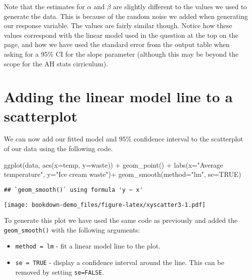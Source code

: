 \documentclass[
]{book}
\newenvironment{Shaded}{\begin{snugshade}}{\end{snugshade}}
\newcommand{\AttributeTok}[1]{\textcolor[rgb]{0.77,0.63,0.00}{#1}}
\newcommand{\ConstantTok}[1]{\textcolor[rgb]{0.00,0.00,0.00}{#1}}
\newcommand{\FunctionTok}[1]{\textcolor[rgb]{0.00,0.00,0.00}{#1}}
\newcommand{\NormalTok}[1]{#1}
\newcommand{\SpecialCharTok}[1]{\textcolor[rgb]{0.00,0.00,0.00}{#1}}
\newcommand{\StringTok}[1]{\textcolor[rgb]{0.31,0.60,0.02}{#1}}
\providecommand{\tightlist}{%
  \setlength{\itemsep}{0pt}\setlength{\parskip}{0pt}}
\begin{document}
Note that the estimates for \(\alpha\) and \(\beta\) are slightly different to the values we used to generate the data. This is because of the random noise we added when generating our response variable. The values are fairly similar though. Notice how these values correspond with the linear model used in the question at the top on the page, and how we have used the standard error from the output table when asking for a 95\% CI for the slope parameter (although this may be beyond the scope for the AH stats cirriculum).

\hypertarget{adding-the-linear-model-line-to-a-scatterplot}{%
\section{Adding the linear model line to a scatterplot}\label{adding-the-linear-model-line-to-a-scatterplot}}

We can now add our fitted model and 95\% confidence interval to the scatterplot of our data using the following code.

\begin{Shaded}
\begin{Highlighting}[]
\FunctionTok{ggplot}\NormalTok{(data, }\FunctionTok{aes}\NormalTok{(}\AttributeTok{x=}\NormalTok{temp, }\AttributeTok{y=}\NormalTok{waste)) }\SpecialCharTok{+} 
  \FunctionTok{geom\_point}\NormalTok{() }\SpecialCharTok{+} 
  \FunctionTok{labs}\NormalTok{(}\AttributeTok{x=}\StringTok{"Average temperature"}\NormalTok{, }\AttributeTok{y=}\StringTok{"Ice cream waste"}\NormalTok{)}\SpecialCharTok{+}
  \FunctionTok{geom\_smooth}\NormalTok{(}\AttributeTok{method=}\StringTok{"lm"}\NormalTok{, }\AttributeTok{se=}\ConstantTok{TRUE}\NormalTok{)}
\end{Highlighting}
\end{Shaded}

\begin{verbatim}
## `geom_smooth()` using formula 'y ~ x'
\end{verbatim}

\texttt{[image: bookdown-demo\_files/figure-latex/xyscatter3-1.pdf]}

To generate this plot we have used the same code as previously and added the \texttt{geom\_smooth()} with the following arguments:

\begin{itemize}
\tightlist
\item
  \texttt{method\ =\ lm} - fit a linear model line to the plot.
\item
  \texttt{se\ =\ TRUE} - display a confidence interval around the line. This can be removed by setting \texttt{se=FALSE}.
\end{itemize}
\end{document}

